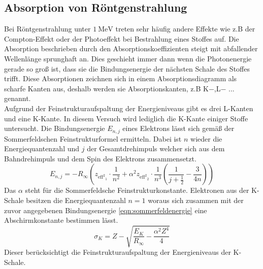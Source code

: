 \subsection{Absorption von Röntgenstrahlung}
Bei Röntgenstrahlung unter $\SI{1}{\mega\electronvolt}$ treten sehr häufig andere Effekte wie z.B der Compton-Effekt oder der Photoeffekt bei Bestrahlung eines Stoffes auf.
Die Absorption beschrieben durch den Absorptionskoeffizienten steigt mit abfallender Wellenlänge sprunghaft an. Dies geschieht immer dann wenn die Photonenergie gerade so groß ist, 
dass sie die Bindungsenergie der nächsten Schale des Stoffes trifft.
Diese Absorptionen zeichnen sich in einem Absorptionsdiagramm als scharfe Kanten aus, deshalb werden sie Absorptionskanten, z.B K${-}$,L${-}$ ... genannt.
\\
Aufgrund der Feinstrukturaufspaltung der Energieniveaus gibt es drei L-Kanten und eine K-Kante. In diesem Versuch wird lediglich die K-Kante einiger Stoffe untersucht.
Die Bindungsenergie $E_{n,j}$ eines Elektrons lässt sich gemäß der Sommerfeldschen Feinstrukturformel ermitteln. Dabei ist $n$ wieder die Energiequantenzahl und $j$ der Gesamtdrehimpuls welcher sich aus dem Bahndrehimpuls und dem
Spin des Elektrons zusammensetzt.
\begin{equation}
\label{eqn:sommerfeldenergie}
E_{n,j} = -R_{\infty} \left(z_{{{\text{eff}}^{2}}_{1}} \cdot \frac{1}{n^{2}} + {\alpha}^{2} z_{{{\text{eff}}^{2}}_{2}} \cdot \frac{1}{n^{3}} \left( \frac{1}{j + \frac{1}{2}} - \frac{3}{4n}\right)  \right)
\end{equation}
Das $\alpha$ steht für die Sommerfeldsche Feinstrukturkonstante. Elektronen aus der K-Schale besitzen die Energiequantenzahl $n = 1$ woraus sich zusammen mit der zuvor angegebenen Bindungsenergie \ref{eqn:sommerfeldenergie} eine
Abschirmkonstante bestimmen lässt.
\begin{equation}
\sigma_{K} = Z - \sqrt{\frac{E_{K}}{R_{\infty}} - \frac{{\alpha}^{2}Z^{4}}{4}}
\end{equation}
Dieser berücksichtigt die Feinstrukturaufspaltung der Energieniveaus der K-Schale.

